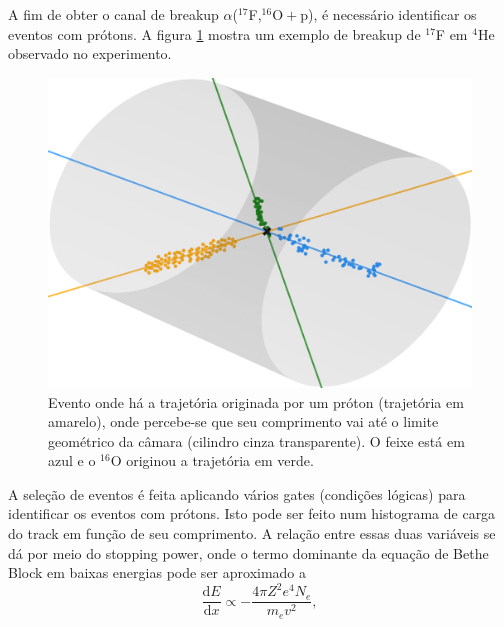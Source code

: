 \documentclass[a4paper,12pt,oneside]{book}
\begin{document}

\par A fim de obter o canal de breakup $\alpha$($^{17}$F,$^{16}\mathrm{O}+\mathrm{p}$), é necessário identificar os eventos com prótons. A figura \ref{fig:exemplo_proton_16O} mostra um exemplo de breakup de $^{17}$F em $^4$He observado no experimento.

\begin{figure}[H]
    \centering
    \includegraphics[scale = 1., width=0.75\columnwidth]{figs/evento_ex_run_261_evento_5853.png}
    \caption{Evento onde há a trajetória originada por um próton (trajetória em amarelo), onde percebe-se que seu comprimento vai até o limite geométrico da câmara (cilindro cinza transparente). O feixe está em azul e o $^{16}$O originou a trajetória em verde.}
    \label{fig:exemplo_proton_16O}
\end{figure}

\par A seleção de eventos é feita aplicando vários gates (condições lógicas) para identificar os eventos com prótons. Isto pode ser feito num histograma de carga do track em função de seu comprimento. A relação entre essas duas variáveis se dá por meio do stopping power, onde o termo dominante da equação de Bethe Block \cite{leo1988techniques} em baixas energias pode ser aproximado a
\begin{equation}\label{eq:bethe_block_low_energies_1}
	\frac{\mathrm{d}E}{\mathrm{d}x} \propto -\frac{4\pi Z^2  e^4 N_e}{m_ev^2},
\end{equation}
\end{document}
